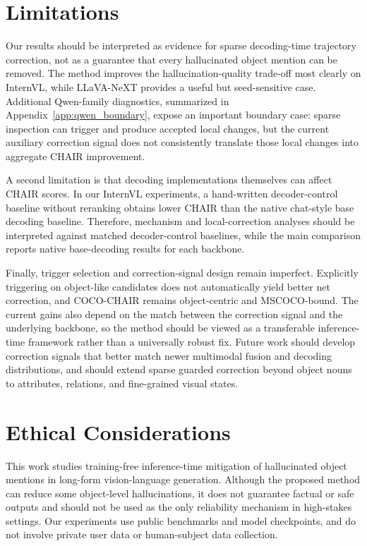 \documentclass[11pt]{article}
\begin{document}
\section{Limitations}

Our results should be interpreted as evidence for sparse decoding-time trajectory correction, not as a guarantee that every hallucinated object mention can be removed. The method improves the hallucination-quality trade-off most clearly on InternVL, while LLaVA-NeXT provides a useful but seed-sensitive case. Additional Qwen-family diagnostics, summarized in Appendix~\ref{app:qwen_boundary}, expose an important boundary case: sparse inspection can trigger and produce accepted local changes, but the current auxiliary correction signal does not consistently translate those local changes into aggregate CHAIR improvement.

A second limitation is that decoding implementations themselves can affect CHAIR scores. In our InternVL experiments, a hand-written decoder-control baseline without reranking obtains lower CHAIR than the native chat-style base decoding baseline. Therefore, mechanism and local-correction analyses should be interpreted against matched decoder-control baselines, while the main comparison reports native base-decoding results for each backbone.

Finally, trigger selection and correction-signal design remain imperfect. Explicitly triggering on object-like candidates does not automatically yield better net correction, and COCO-CHAIR remains object-centric and MSCOCO-bound. The current gains also depend on the match between the correction signal and the underlying backbone, so the method should be viewed as a transferable inference-time framework rather than a universally robust fix. Future work should develop correction signals that better match newer multimodal fusion and decoding distributions, and should extend sparse guarded correction beyond object nouns to attributes, relations, and fine-grained visual states.

\section{Ethical Considerations}

This work studies training-free inference-time mitigation of hallucinated object mentions in long-form vision-language generation. Although the proposed method can reduce some object-level hallucinations, it does not guarantee factual or safe outputs and should not be used as the only reliability mechanism in high-stakes settings. Our experiments use public benchmarks and model checkpoints, and do not involve private user data or human-subject data collection.
\end{document}
